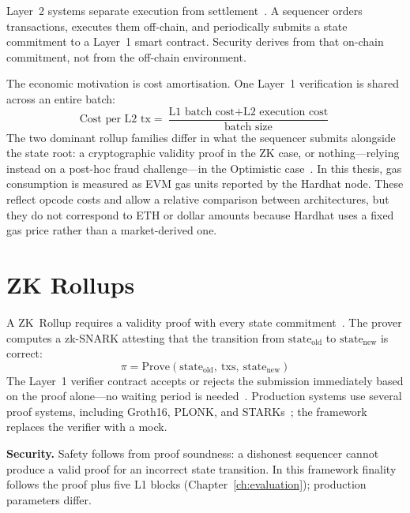 Layer~2 systems separate execution from settlement~\cite{gudgeon2020sok}. A sequencer orders transactions, executes them off-chain, and periodically submits a state commitment to a Layer~1 smart contract. Security derives from that on-chain commitment, not from the off-chain environment.

The economic motivation is cost amortisation. One Layer~1 verification is shared across an entire batch:
\begin{equation}
  \text{Cost per L2 tx} =
    \frac{\text{L1 batch cost} + \text{L2 execution cost}}{\text{batch size}}
\end{equation}
The two dominant rollup families differ in what the sequencer submits alongside the state root: a cryptographic validity proof in the ZK case, or nothing---relying instead on a post-hoc fraud challenge---in the Optimistic case~\cite{sok-layer2}. In this thesis, gas consumption is measured as EVM gas units reported by the Hardhat node. These reflect opcode costs and allow a relative comparison between architectures, but they do not correspond to ETH or dollar amounts because Hardhat uses a fixed gas price rather than a market-derived one.

\section{ZK Rollups}
\label{sec:zk}

A ZK~Rollup requires a validity proof with every state commitment~\cite{sok-layer2}. The prover computes a zk-SNARK attesting that the transition from $\text{state}_\text{old}$ to $\text{state}_\text{new}$ is correct:
\begin{equation}
  \pi = \text{Prove}(\text{state}_\text{old},\ \text{txs},\ \text{state}_\text{new})
\end{equation}
The Layer~1 verifier contract accepts or rejects the submission immediately based on the proof alone---no waiting period is needed~\cite{sok-layer2}. Production systems use several proof systems, including Groth16, PLONK, and STARKs~\cite{groth2016size,gabizon2019plonk,bensasson2018stark}; the framework replaces the verifier with a mock.

\textbf{Security.}
Safety follows from proof soundness: a dishonest sequencer cannot produce a valid proof for an incorrect state transition. In this framework finality follows the proof plus five L1 blocks (Chapter~\ref{ch:evaluation}); production parameters differ.

